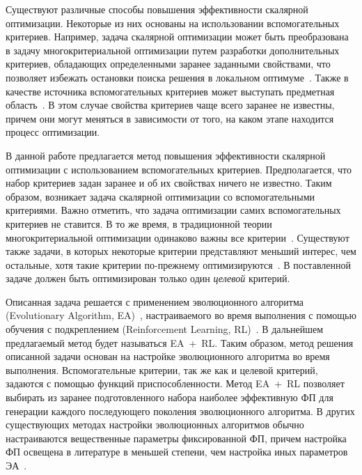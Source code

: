 \startprefacepage

Существуют различные способы повышения эффективности скалярной оптимизации. Некоторые из них основаны на использовании вспомогательных критериев. Например, задача скалярной оптимизации может быть преобразована в задачу многокритериальной оптимизации путем разработки дополнительных критериев, обладающих определенными заранее заданными свойствами, что позволяет избежать остановки поиска решения в локальном оптимуме~\cite{mh-iff}. Также в качестве источника вспомогательных критериев может выступать предметная область~\cite{master}. В этом случае свойства критериев чаще всего заранее не известны, причем они могут меняться в зависимости от того, на каком этапе находится процесс оптимизации. 

В данной работе предлагается метод повышения эффективности скалярной оптимизации с использованием вспомогательных критериев. Предполагается, что набор критериев задан заранее и об их свойствах ничего не известно. Таким образом, возникает задача скалярной оптимизации со вспомогательными критериями. Важно отметить, что задача оптимизации самих вспомогательных критериев не ставится. В то же время, в традиционной теории многокритериальной оптимизации одинаково важны все критерии~\cite{criteries, multicriteria, multievol}. Существуют также задачи, в которых некоторые критерии представляют меньший интерес, чем остальные, хотя такие критерии по-прежнему оптимизируются~\cite{ref-point}. В поставленной задаче должен быть оптимизирован только один \emph{целевой} критерий.

Описанная задача решается с применением эволюционного алгоритма (Evolutionary Algorithm, EA)~\cite{nature-inspired, essentials, mitchell-ga, skobtsov}, настраиваемого во время выполнения с помощью обучения с подкреплением (Reinforcement Learning, RL)~\cite{alpaydin, gosavi, sutton, survey}. В дальнейшем предлагаемый метод будет называться EA~+~RL. Таким образом, метод решения описанной задачи основан на настройке эволюционного алгоритма во время выполнения. Вспомогательные критерии, так же как и целевой критерий, задаются с помощью функций приспособленности. Метод EA~+~RL позволяет выбирать из заранее подготовленного набора наиболее эффективную ФП для генерации каждого последующего поколения эволюционного алгоритма. В других существующих методах настройки эволюционных алгоритмов обычно настраиваются вещественные параметры фиксированной ФП, причем настройка ФП освещена в литературе в меньшей степени, чем настройка иных параметров ЭА~\cite{adjusting, fuzzy, filtered-ff, es-rl}. 

